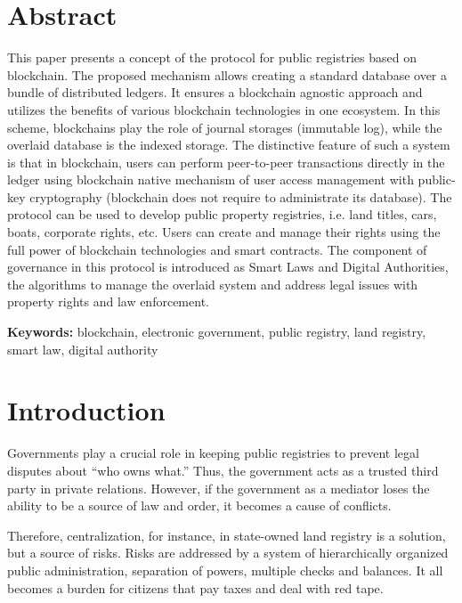 \begin{multicols}{2}

\section*{Abstract} 

This paper presents a concept of the protocol for public registries based on blockchain. The proposed mechanism allows creating a standard database over a bundle of distributed ledgers. It ensures a blockchain agnostic approach and utilizes the benefits of various blockchain technologies in one ecosystem. In this scheme, blockchains play the role of journal storages (immutable log), while the overlaid database is the indexed storage. The distinctive feature of such a system is that in blockchain, users can perform peer-to-peer transactions directly in the ledger using blockchain native mechanism of user access management with public-key cryptography (blockchain does not require to administrate its database). The protocol can be used to develop public property registries, i.e. land titles, cars, boats, corporate rights, etc. Users can create and manage their rights using the full power of blockchain technologies and smart contracts. The component of governance in this protocol is introduced as Smart Laws and Digital Authorities, the algorithms to manage the overlaid system and address legal issues with property rights and law enforcement.

\textbf{Keywords:} blockchain, electronic government, public registry, land registry, smart law, digital authority

\section{Introduction}
 
Governments play a crucial role in keeping public registries to prevent legal disputes about “who owns what.” Thus, the government acts as a trusted third party in private relations. However, if the government as a mediator loses the ability to be a source of law and order, it becomes a cause of conflicts.

Therefore, centralization, for instance, in state-owned land registry is a solution, but a source of risks. Risks are addressed by a system of hierarchically organized public administration, separation of powers, multiple checks and balances. It all becomes a burden for citizens that pay taxes and deal with red tape.


\end{multicols}
